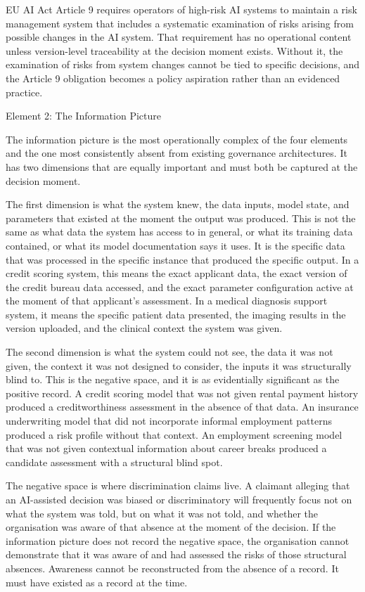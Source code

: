 EU AI Act Article 9 requires operators of high-risk AI systems to maintain a risk management system that includes a systematic examination of risks arising from possible changes in the AI system. That requirement has no operational content unless version-level traceability at the decision moment exists. Without it, the examination of risks from system changes cannot be tied to specific decisions, and the Article 9 obligation becomes a policy aspiration rather than an evidenced practice.

Element 2: The Information Picture

The information picture is the most operationally complex of the four elements and the one most consistently absent from existing governance architectures. It has two dimensions that are equally important and must both be captured at the decision moment.

The first dimension is what the system knew, the data inputs, model state, and parameters that existed at the moment the output was produced. This is not the same as what data the system has access to in general, or what its training data contained, or what its model documentation says it uses. It is the specific data that was processed in the specific instance that produced the specific output. In a credit scoring system, this means the exact applicant data, the exact version of the credit bureau data accessed, and the exact parameter configuration active at the moment of that applicant's assessment. In a medical diagnosis support system, it means the specific patient data presented, the imaging results in the version uploaded, and the clinical context the system was given.

The second dimension is what the system could not see, the data it was not given, the context it was not designed to consider, the inputs it was structurally blind to. This is the negative space, and it is as evidentially significant as the positive record. A credit scoring model that was not given rental payment history produced a creditworthiness assessment in the absence of that data. An insurance underwriting model that did not incorporate informal employment patterns produced a risk profile without that context. An employment screening model that was not given contextual information about career breaks produced a candidate assessment with a structural blind spot.

The negative space is where discrimination claims live. A claimant alleging that an AI-assisted decision was biased or discriminatory will frequently focus not on what the system was told, but on what it was not told, and whether the organisation was aware of that absence at the moment of the decision. If the information picture does not record the negative space, the organisation cannot demonstrate that it was aware of and had assessed the risks of those structural absences. Awareness cannot be reconstructed from the absence of a record. It must have existed as a record at the time.

